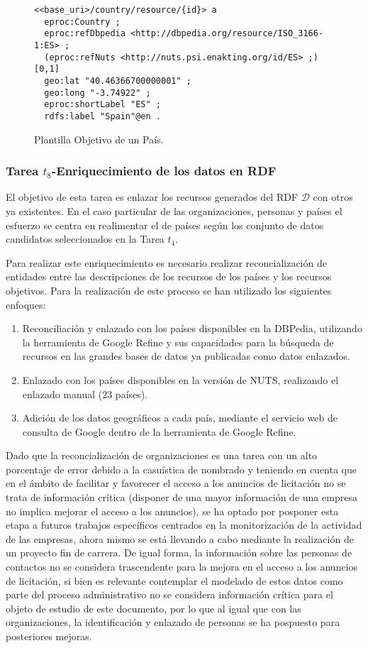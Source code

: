 \begin{figure}[!htp]
\begin{lstlisting} 
<<base_uri>/country/resource/{id}> a 
  eproc:Country ;
  eproc:refDbpedia <http://dbpedia.org/resource/ISO_3166-1:ES> ;
  (eproc:refNuts <http://nuts.psi.enakting.org/id/ES> ;) [0,1]
  geo:lat "40.46366700000001" ;
  geo:long "-3.74922" ;
  eproc:shortLabel "ES" ;
  rdfs:label "Spain"@en .
\end{lstlisting}
	\caption{Plantilla Objetivo de un País.}
	\label{fig:country-template}
\end{figure}


\subsubsection{Tarea $t_8$-Enriquecimiento de los datos en RDF}\label{t8-orgs}
El objetivo de esta tarea es enlazar los recursos generados del \dataset \gls{RDF} $\mathcal{D}$ con otros 
ya existentes. En el caso particular de las organizaciones, personas y países el esfuerzo se centra 
en realimentar el \dataset de países según los conjunto de datos candidatos seleccionados en la Tarea $t_4$.

Para realizar este enriquecimiento es necesario realizar reconcialización de entidades entre las descripciones 
de los recursos de los países y los recursos objetivos. Para la realización de este proceso se han utilizado los 
siguientes enfoques:
\begin{enumerate}
 \item Reconciliación y enlazado con los países disponibles en la DBPedia, utilizando la herramienta de Google 
Refine y sus capacidades para la búsqueda de recursos en las grandes bases de datos ya publicadas como datos enlazados.
 \item Enlazado con los países disponibles en la versión \linkeddata de \gls{NUTS}, realizando el enlazado manual ($23$ países).
 \item Adición de los datos geográficos a cada país, mediante el servicio web de consulta de Google dentro de la herramienta 
de Google Refine.
\end{enumerate}

Dado que la reconcialización de organizaciones es una tarea con un alto porcentaje de error debido a la casuística de nombrado 
y teniendo en cuenta que en el ámbito de facilitar y favorecer el acceso a los anuncios de licitación no se trata de información 
crítica (disponer de una mayor información de una empresa no implica mejorar el acceso a los anuncios), se ha optado por posponer 
esta etapa a futuros trabajos específicos centrados en la monitorización de la actividad de las empresas, ahora mismo se está llevando 
a cabo mediante la realización de un proyecto fin de carrera. De igual forma, la información sobre las personas de contactos no se considera 
trascendente para la mejora en el acceso a los anuncios de licitación, si bien es relevante contemplar el modelado de estos datos como parte del 
proceso administrativo no se considera información crítica para el objeto de estudio de este documento, 
por lo que al igual que con las organizaciones, la identificación y enlazado de personas se ha pospuesto para posteriores mejoras.


